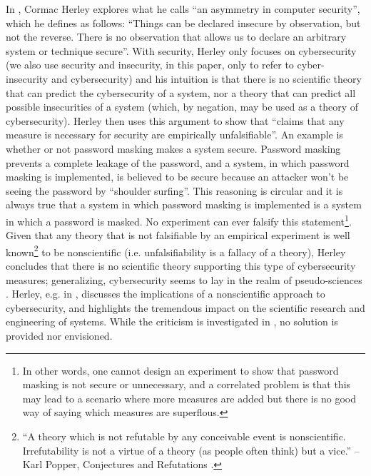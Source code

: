 \documentclass[conference]{IEEEtran}
\begin{document}
In \autocite{Herley2016unfalsifiability}, Cormac Herley explores what he calls
``an asymmetry in computer security'', which he defines as follows: ``Things
can be declared insecure by observation, but not the reverse. There is no
observation that allows us to declare an arbitrary system or technique
secure''. With security, Herley only focuses on cybersecurity (we also use
security and insecurity, in this paper, only to refer to cyber-insecurity and
cybersecurity) and his intuition is that there is no scientific theory that can
predict the cybersecurity of a system, nor a theory that can predict all
possible insecurities of a system (which, by negation, may be used as a theory
of cybersecurity).  Herley then uses this argument to show that ``claims that
any measure is necessary for security are empirically unfalsifiable''. An
example is whether or not password masking makes a system secure. Password
masking prevents a complete leakage of the password, and a system, in which
password masking is implemented, is believed to be secure because an attacker
won't be seeing the password by ``shoulder surfing''.  This reasoning
is circular and it is always true that a system in which password masking is
implemented is a system in which a password is masked. No experiment can ever
falsify this statement\footnote{In other words, one cannot design an experiment to show that
password masking is not secure or unnecessary, and a correlated problem is that
this may lead to a scenario where more measures are added but there is no good
way of saying which measures are superflous.}. Given that any theory that is not falsifiable by an
empirical experiment is well known\footnote{``A theory which is not refutable
by any conceivable event is nonscientific. Irrefutability is not a virtue of a
theory (as people often think) but a vice.'' -- Karl Popper, Conjectures and
Refutations \autocite{popper1962conjectures}.} to be nonscientific (i.e.
unfalsifiability is a fallacy of a theory), Herley concludes that there is no
scientific theory supporting this type of cybersecurity measures; generalizing,
cybersecurity seems to lay in the realm of pseudo-sciences
\autocite{Herley2016usenixvideo}. Herley, e.g.  in
\autocite{Herley2017justifying}, discusses the implications of a nonscientific
approach to cybersecurity, and highlights the tremendous impact on the
scientific research and engineering of systems. While the criticism is
investigated in \autocite{Herley2016unfalsifiability}, no solution is provided
nor envisioned.  
\end{document}
